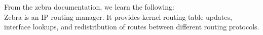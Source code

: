 From the zebra documentation, we learn the following: \\
Zebra is an IP routing manager. It provides kernel routing table updates, interface lookups, and redistribution of routes between different routing protocols.
